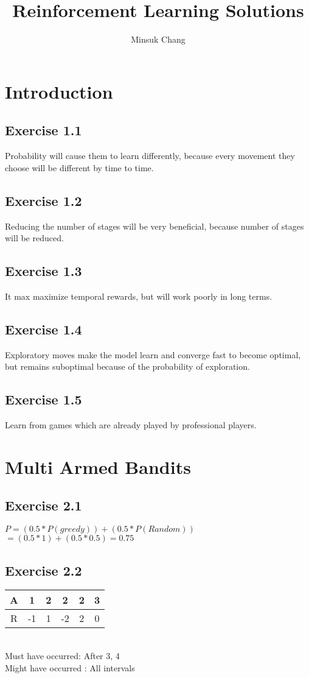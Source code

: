 \documentclass{report}
\title{Reinforcement Learning Solutions}
\author{Minsuk Chang}
\begin{document}
\maketitle
\pagebreak
\chapter{Introduction}

\section*{Exercise 1.1}
Probability will cause them to learn differently, because every movement they choose will be different by time to time.

\section*{Exercise 1.2}
Reducing the number of stages will be very beneficial, because number of stages will be reduced.

\section*{Exercise 1.3}
It max maximize temporal rewards, but will work poorly in long terms.

\section*{Exercise 1.4}
Exploratory moves make the model learn and converge fast to become optimal, but remains suboptimal because of the probability of exploration.

\section*{Exercise 1.5}
Learn from games which are already played by professional players.

\chapter{Multi Armed Bandits}
\section*{Exercise 2.1}
$P = (0.5*P(greedy))+(0.5*P(Random))$
$= (0.5*1)+(0.5*0.5)=0.75$

\section*{Exercise 2.2}
\begin{tabular}{ c | c c c c c }
 A & 1 & 2 & 2 & 2 & 3 \\
 \hline
 R & -1 & 1 & -2 & 2 & 0
\end{tabular}\\
Must have occurred: After 3, 4\\
Might have occurred : All intervals
\end{document}
